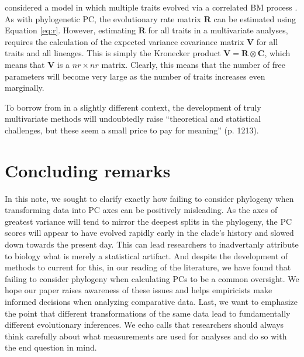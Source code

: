 \documentclass[a4paper,12pt]{article}
\begin{document}
 \citet{RevellHarmon} considered a model in which multiple traits evolved via a correlated BM process \citep[see also][]{Motmot}. As with phylogenetic PC, the evolutionary rate matrix $\mathbf{R}$ can be estimated using Equation \ref{eq:r}. However, estimating $\mathbf{R}$ for all traits in a multivariate analyses, requires the calculation of the expected variance covariance matrix $\mathbf{V}$ for all traits and all lineages. This is simply the Kronecker product $\mathbf{V} = \mathbf{R} \otimes \mathbf{C}$, which means that $\mathbf{V}$ is a $n r \times n  r$ matrix. Clearly, this means that the number of free parameters will become very large as the number of traits increases even marginally.

To borrow from \citet{HansenHoule2008} in a slightly different context, the development of truly multivariate methods will undoubtedly raise ``theoretical and statistical challenges, but these seem a small price to pay for meaning'' (p. 1213).

\section{Concluding remarks}
In this note, we sought to clarify exactly how failing to consider phylogeny when transforming data into PC axes can be positively misleading. As the axes of greatest variance will tend to mirror the deepest splits in the phylogeny, the PC scores will appear to have evolved rapidly early in the clade's history and slowed down towards the present day. This can lead researchers to inadvertanly attribute to biology what is merely a statistical artifact. And despite the development of methods to current for this, in our reading of the literature, we have found that failing to consider phylogeny when calculating PCs to be a common oversight. We hope our paper raises awareness of these issues and helps empiricists make informed decisions when analyzing comparative data. Last, we want to emphasize the point that different transformations of the same data lead to fundamentally different evolutionary inferences. We echo calls \citep{HansenHoule2008, Houle2011} that researchers should always think carefully about what measurements are used for analyses and do so with the end question in mind.

\newpage



\end{document}
